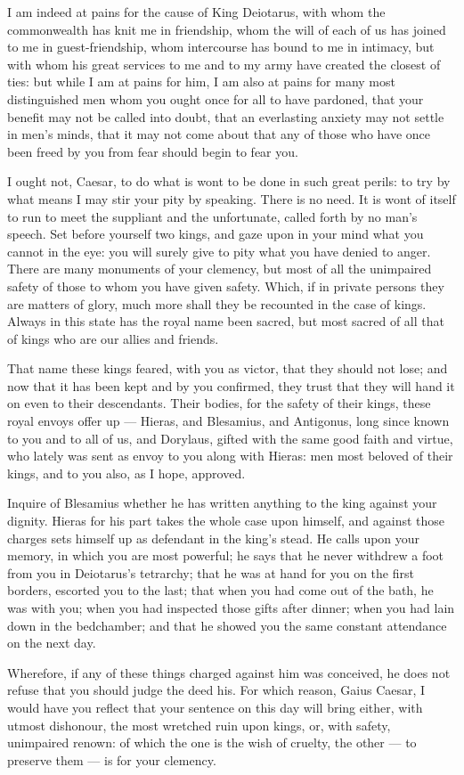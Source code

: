  I am indeed at pains for the cause of King Deiotarus, with whom the commonwealth has knit me in friendship, whom the will of each of us has joined to me in guest-friendship, whom intercourse has bound to me in intimacy, but with whom his great services to me and to my army have created the closest of ties: but while I am at pains for him, I am also at pains for many most distinguished men whom you ought once for all to have pardoned, that your benefit may not be called into doubt, that an everlasting anxiety may not settle in men's minds, that it may not come about that any of those who have once been freed by you from fear should begin to fear you.

 I ought not, Caesar, to do what is wont to be done in such great perils: to try by what means I may stir your pity by speaking. There is no need. It is wont of itself to run to meet the suppliant and the unfortunate, called forth by no man's speech. Set before yourself two kings, and gaze upon in your mind what you cannot in the eye: you will surely give to pity what you have denied to anger. There are many monuments of your clemency, but most of all the unimpaired safety of those to whom you have given safety. Which, if in private persons they are matters of glory, much more shall they be recounted in the case of kings. Always in this state has the royal name been sacred, but most sacred of all that of kings who are our allies and friends.

 That name these kings feared, with you as victor, that they should not lose; and now that it has been kept and by you confirmed, they trust that they will hand it on even to their descendants. Their bodies, for the safety of their kings, these royal envoys offer up --- Hieras, and Blesamius, and Antigonus, long since known to you and to all of us, and Dorylaus, gifted with the same good faith and virtue, who lately was sent as envoy to you along with Hieras: men most beloved of their kings, and to you also, as I hope, approved.

 Inquire of Blesamius whether he has written anything to the king against your dignity. Hieras for his part takes the whole case upon himself, and against those charges sets himself up as defendant in the king's stead. He calls upon your memory, in which you are most powerful; he says that he never withdrew a foot from you in Deiotarus's tetrarchy; that he was at hand for you on the first borders, escorted you to the last; that when you had come out of the bath, he was with you; when you had inspected those gifts after dinner; when you had lain down in the bedchamber; and that he showed you the same constant attendance on the next day.

 Wherefore, if any of these things charged against him was conceived, he does not refuse that you should judge the deed his. For which reason, Gaius Caesar, I would have you reflect that your sentence on this day will bring either, with utmost dishonour, the most wretched ruin upon kings, or, with safety, unimpaired renown: of which the one is the wish of cruelty, the other --- to preserve them --- is for your clemency.
